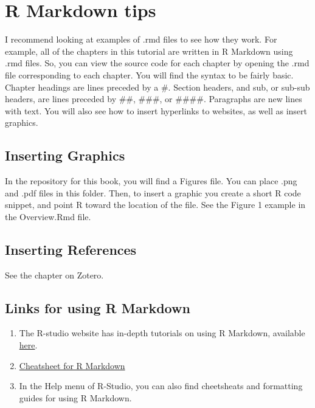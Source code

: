 \documentclass[]{book}
\providecommand{\tightlist}{%
  \setlength{\itemsep}{0pt}\setlength{\parskip}{0pt}}
\theoremstyle{definition}
\theoremstyle{definition}
\theoremstyle{definition}
\theoremstyle{remark}
\begin{document}
\section{R Markdown tips}\label{r-markdown-tips}

I recommend looking at examples of .rmd files to see how they work. For
example, all of the chapters in this tutorial are written in R Markdown
using .rmd files. So, you can view the source code for each chapter by
opening the .rmd file corresponding to each chapter. You will find the
syntax to be fairly basic. Chapter headings are lines preceded by a \#.
Section headers, and sub, or sub-sub headers, are lines preceded by
\#\#, \#\#\#, or \#\#\#\#. Paragraphs are new lines with text. You will
also see how to insert hyperlinks to websites, as well as insert
graphics.

\subsection{Inserting Graphics}\label{inserting-graphics}

In the repository for this book, you will find a Figures file. You can
place .png and .pdf files in this folder. Then, to insert a graphic you
create a short R code snippet, and point R toward the location of the
file. See the Figure 1 example in the Overview.Rmd file.

\subsection{Inserting References}\label{inserting-references}

See the chapter on Zotero.

\subsection{Links for using R
Markdown}\label{links-for-using-r-markdown}

\begin{enumerate}
\def\labelenumi{\arabic{enumi}.}
\tightlist
\item
  The R-studio website has in-depth tutorials on using R Markdown,
  available \href{http://rmarkdown.rstudio.com/lesson-1.html}{here}.
\item
  \href{http://rmarkdown.rstudio.com/lesson-15.html}{Cheatsheet for R
  Markdown}
\item
  In the Help menu of R-Studio, you can also find cheetsheats and
  formatting guides for using R Markdown.
\end{enumerate}
\end{document}
